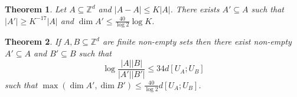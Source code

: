 \documentclass[10pt,a4paper]{article}
\newtheorem{theorem}{Theorem}
\newcommand{\lean}[1]{}
\newcommand{\leanok}{}
\begin{document}
\begin{theorem}\label{weak-pfr-int}\lean{weak_PFR_int}\leanok
Let $A\subseteq \mathbb{Z}^d$ and $\lvert A-A\rvert\leq K\lvert A\rvert$.
There exists $A'\subseteq A$ such that $\lvert A'\rvert \geq K^{-17}\lvert
A\rvert$ and $\dim A' \leq \frac{40}{\log 2}\log K$.
\end{theorem}

\begin{theorem}\label{weak-pfr-asymm}\lean{weak_PFR_asymm}\leanok
If $A,B\subseteq \mathbb{Z}^d$ are finite non-empty sets then there exist non-empty $A'\subseteq A$ and $B'\subseteq B$ such that
\[\log\frac{\lvert A\rvert\lvert B\rvert}{\lvert A'\rvert\lvert B'\rvert}\leq 34d[U_A;U_B]\]
such that $\max(\dim A',\dim B')\leq \frac{40}{\log 2} d[U_A;U_B]$.
\end{theorem}
\end{document}
